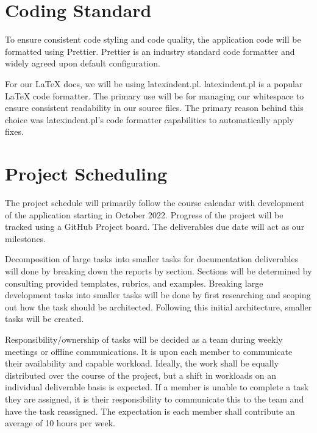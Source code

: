 \documentclass{article}
\begin{document}
\section{Coding Standard}

To ensure consistent code styling and code quality, the application code will be formatted using
Prettier. Prettier is an industry standard code formatter and widely agreed upon default
configuration.

For our \LaTeX{} docs, we will be using latexindent.pl. latexindent.pl is a popular \LaTeX{} code
formatter. The primary use will be for managing our whitespace to ensure consistent readability in
our source files. The primary reason behind this choice was latexindent.pl's code formatter
capabilities to automatically apply fixes.

\section{Project Scheduling}


The project schedule will primarily follow the course calendar with development of the application
starting in October 2022. Progress of the project will be tracked using a GitHub Project board. The
deliverables due date will act as our milestones.

Decomposition of large tasks into smaller tasks for documentation deliverables will done by breaking
down the reports by section. Sections will be determined by consulting provided templates, rubrics,
and examples. Breaking large development tasks into smaller tasks will be done by first researching
and scoping out how the task should be architected. Following this initial architecture, smaller
tasks will be created.

Responsibility/ownership of tasks will be decided as a team during weekly meetings or offline
communications. It is upon each member to communicate their availability and capable workload.
Ideally, the work shall be equally distributed over the course of the project, but a shift in
workloads on an individual deliverable basis is expected. If a member is unable to complete a task
they are assigned, it is their responsibility to communicate this to the team and have the task
reassigned. The expectation is each member shall contribute an average of 10 hours per week.
\end{document}
